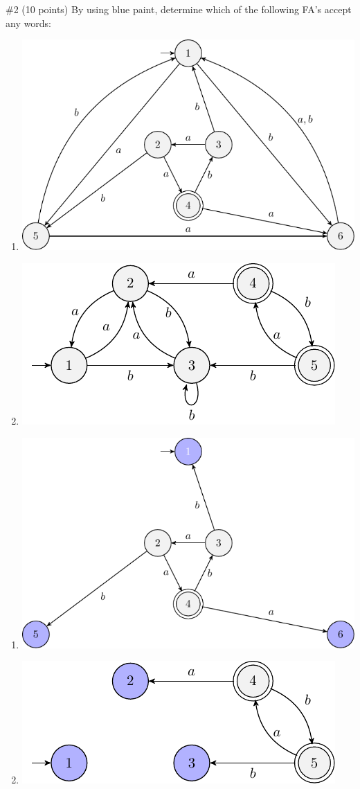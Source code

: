 \begin{problem}{\#2 (10 points)}
    By using blue paint, determine which of the following FA's accept any words:
    \begin{enumerate}[label=\alph*)]
        \item \includegraphics[width=0.7\linewidth]{figures/questions/2a.pdf}
        \item \includegraphics[width=0.6\linewidth]{figures/questions/2b.pdf}
    \end{enumerate}
\end{problem}
\begin{solution}
    \begin{enumerate}
        \item \includegraphics[width=0.7\linewidth]{figures/answers/2a.pdf}
        \item \includegraphics[width=0.6\linewidth]{figures/answers/2b.pdf}
    \end{enumerate}
\end{solution}

